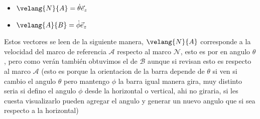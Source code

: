 \begin{tcolorbox}[title=Solucion,breakable]
        \begin{itemize}
            \item $\velang{N}{A}=\dot \theta\vec{e}_z$
            \item $\velang{A}{B}=\dot \phi\vec{e}_z$
        \end{itemize}
Estos vectores se leen de la siguiente manera, $\velang{N}{A}$ corresponde a la velocidad del marco de referencia $\mathcal{A}$ respecto al marco $\mathcal{N}$, esto es por en angulo $\theta$, pero como verán también obtuvimos el de $\mathcal{B}$ aunque si revisan esto es respecto al marco $\mathcal{A}$ (esto es porque la orientacion de la barra depende de $\theta$ si ven si cambio el angulo $\theta$ pero mantengo $\phi$ la barra igual manera gira, muy distinto seria si defino el angulo $\phi$ desde la horizontal o vertical, ahi no giraria, si les cuesta visualizarlo pueden agregar el angulo y generar un nuevo angulo que si sea respecto a la horizontal)
    \begin{center}
    
\end{center}
\end{tcolorbox}
